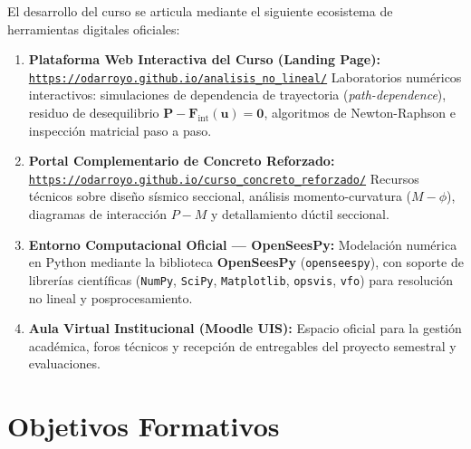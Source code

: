 \documentclass[11pt,letterpaper]{article}
\begin{document}
El desarrollo del curso se articula mediante el siguiente ecosistema de herramientas digitales oficiales:

\begin{enumerate}[leftmargin=16pt, topsep=1.5pt, itemsep=2pt, parsep=0pt, label=\textbf{\arabic*.}]
    \item \textbf{Plataforma Web Interactiva del Curso (Landing Page):} \newline
    \href{https://odarroyo.github.io/analisis_no_lineal/}{\small\texttt{https://odarroyo.github.io/analisis\_no\_lineal/}} \newline
    {\small Laboratorios numéricos interactivos: simulaciones de dependencia de trayectoria (\textit{path-dependence}), residuo de desequilibrio $\mathbf{P} - \mathbf{F}_{\text{int}}(\mathbf{u}) = \mathbf{0}$, algoritmos de Newton-Raphson e inspección matricial paso a paso.}

    \item \textbf{Portal Complementario de Concreto Reforzado:} \newline
    \href{https://odarroyo.github.io/curso_concreto_reforzado/}{\small\texttt{https://odarroyo.github.io/curso\_concreto\_reforzado/}} \newline
    {\small Recursos técnicos sobre diseño sísmico seccional, análisis momento-curvatura ($M-\phi$), diagramas de interacción $P-M$ y detallamiento dúctil seccional.}

    \item \textbf{Entorno Computacional Oficial --- OpenSeesPy:} \newline
    {\small Modelación numérica en Python mediante la biblioteca \textbf{OpenSeesPy} (\texttt{openseespy}), con soporte de librerías científicas (\texttt{NumPy}, \texttt{SciPy}, \texttt{Matplotlib}, \texttt{opsvis}, \texttt{vfo}) para resolución no lineal y posprocesamiento.}

    \item \textbf{Aula Virtual Institucional (Moodle UIS):} \newline
    {\small Espacio oficial para la gestión académica, foros técnicos y recepción de entregables del proyecto semestral y evaluaciones.}
\end{enumerate}

\vspace{0.05cm}

\section{Objetivos Formativos}
\end{document}
